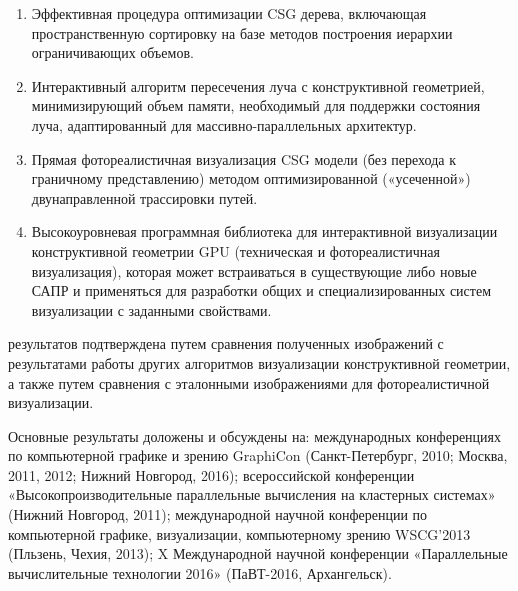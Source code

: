 {}
\begin{enumerate}
  \item Эффективная процедура оптимизации CSG дерева, включающая пространственную сортировку на базе методов построения иерархии ограничивающих объемов.
  \item Интерактивный алгоритм пересечения луча с конструктивной геометрией, минимизирующий объем памяти, необходимый для поддержки состояния луча, адаптированный для массивно-параллельных архитектур.
  \item Прямая фотореалистичная визуализация CSG модели (без перехода к граничному представлению) методом оптимизированной («усеченной») двунаправленной трассировки путей.
  \item Высокоуровневая программная библиотека для интерактивной визуализации конструктивной геометрии GPU (техническая и фотореалистичная визуализация), которая может встраиваться в существующие либо новые САПР и применяться для разработки общих и специализированных систем визуализации с заданными свойствами.
\end{enumerate} 

{\reliability} результатов подтверждена путем сравнения полученных изображений с результатами работы других алгоритмов визуализации конструктивной геометрии, а также путем сравнения с эталонными изображениями для фотореалистичной визуализации.

{\probation}
Основные результаты доложены и обсуждены на: международных конференциях по компьютерной графике и зрению GraphiCon (Санкт-Петербург, 2010; Москва, 2011, 2012;  Нижний Новгород, 2016); всероссийской конференции «Высокопроизводительные параллельные вычисления на кластерных системах» (Нижний Новгород, 2011); международной научной конференции по компьютерной графике, визуализации, компьютерному зрению WSCG'2013 (Пльзень, Чехия, 2013); X Международной научной конференции «Параллельные вычислительные технологии 2016» (ПаВТ-2016, Архангельск).




